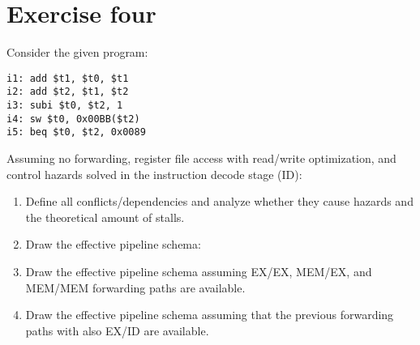 \section{Exercise four}

Consider the given program:
\begin{verbatim}
i1: add $t1, $t0, $t1
i2: add $t2, $t1, $t2
i3: subi $t0, $t2, 1
i4: sw $t0, 0x00BB($t2)
i5: beq $t0, $t2, 0x0089   
\end{verbatim}
Assuming no forwarding, register file access with read/write optimization, and control hazards solved in the instruction decode stage (ID):
\begin{enumerate}
    \item Define all conflicts/dependencies and analyze whether they cause hazards and the theoretical amount of stalls.
    \item Draw the effective pipeline schema:
    \item Draw the effective pipeline schema assuming EX/EX, MEM/EX, and MEM/MEM forwarding paths are available. 
    \item Draw the effective pipeline schema assuming that the previous forwarding paths with also EX/ID are available.
\end{enumerate}

